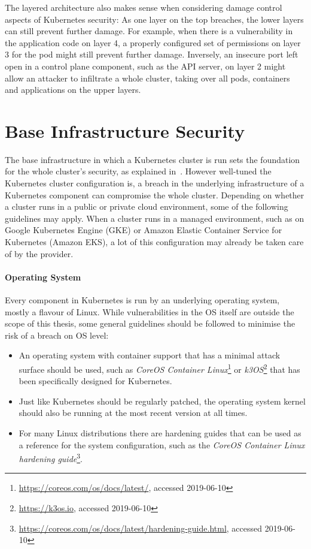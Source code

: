 The layered architecture also makes sense when considering damage control aspects of Kubernetes security: As one layer on the top breaches, the lower layers can still prevent further damage. For example, when there is a vulnerability in the application code on layer 4, a properly configured set of permissions on layer 3 for the pod might still prevent further damage. Inversely, an insecure port left open in a control plane component, such as the API server, on layer 2 might allow an attacker to infiltrate a whole cluster, taking over all pods, containers and applications on the upper layers. 
	
\section{Base Infrastructure Security} \label{sec:layer1}

The base infrastructure in which a Kubernetes cluster is run sets the foundation for the whole cluster's security, as explained in~\textcite{securingkubernetesBaseInfra}. However well-tuned the Kubernetes cluster configuration is, a breach in the underlying infrastructure of a Kubernetes component can compromise the whole cluster. Depending on whether a cluster runs in a public or private cloud environment, some of the following guidelines may apply. When a cluster runs in a managed environment, such as on Google Kubernetes Engine (GKE) or Amazon Elastic Container Service for Kubernetes (Amazon EKS), a lot of this configuration may already be taken care of by the provider.

\paragraph{Operating System}

Every component in Kubernetes is run by an underlying operating system, mostly a flavour of Linux. While vulnerabilities in the OS itself are outside the scope of this thesis, some general guidelines should be followed to minimise the risk of a breach on OS level:

\begin{itemize}
    \item An operating system with container support that has a minimal attack surface should be used, such as \textit{CoreOS Container Linux}\footnote{\url{https://coreos.com/os/docs/latest/}, accessed 2019-06-10} or \textit{k3OS}\footnote{\url{https://k3os.io}, accessed 2019-06-10} that has been specifically designed for Kubernetes.
    \item Just like Kubernetes should be regularly patched, the operating system kernel should also be running at the most recent version at all times.
    \item For many Linux distributions there are hardening guides that can be used as a reference for the system configuration, such as the \textit{CoreOS Container Linux hardening guide}\footnote{\url{https://coreos.com/os/docs/latest/hardening-guide.html}, accessed 2019-06-10}. 
\end{itemize}

